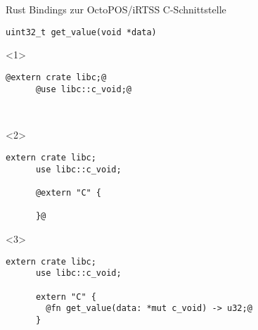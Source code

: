 

\lstset{showstringspaces=true,columns=fullflexible,keepspaces=true}

\begin{frame}[fragile]{Rust Bindings zur OctoPOS/iRTSS C-Schnittstelle}

  \begin{lstlisting}[frame=single,style=base]
    uint32_t get_value(void *data)\end{lstlisting}

  \begin{onlyenv}<1> {
    \begin{lstlisting}[frame=single,style=base]
      @extern crate libc;@
      @use libc::c_void;@



    \end{lstlisting}
  }
  \end{onlyenv}

  \begin{onlyenv}<2> {
    \begin{lstlisting}[frame=single,style=base]
      extern crate libc;
      use libc::c_void;

      @extern "C" {

      }@\end{lstlisting}
  }
  \end{onlyenv}

  \begin{onlyenv}<3> {
    \begin{lstlisting}[frame=single,style=base]
      extern crate libc;
      use libc::c_void;

      extern "C" {
        @fn get_value(data: *mut c_void) -> u32;@
      }\end{lstlisting}
  }
  \end{onlyenv}

\end{frame}
